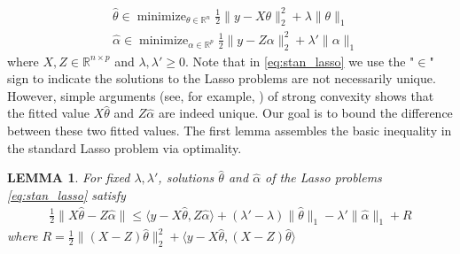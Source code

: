 \documentclass[a4paper]{article}
\newtheorem{lemma}{LEMMA}
\newcommand{\RR}{\mathbb{R}}
\DeclareMathOperator*{\minimize}{minimize}
\begin{document}
\begin{equation}
\begin{aligned}
&\hat{\theta} \in \minimize_{\theta\in\RR^n} \frac{1}{2}\|y-X\theta\|_2^2 + \lambda\|\theta\|_1\\
&\hat{\alpha} \in \minimize_{\alpha\in\RR^p} \frac{1}{2}\|y-Z\alpha\|_2^2 + \lambda'\|\alpha\|_1
\end{aligned}
\label{eq:stan_lasso}
\end{equation}
where $X,Z\in\RR^{n\times p}$ and $\lambda,\lambda'\geq 0$. Note that in \eqref{eq:stan_lasso} we use the "$\in$" sign to indicate the solutions to the  Lasso problems are not necessarily unique. However, simple arguments (see, for example, \cite{tibshirani2013lasso}) of strong convexity shows that the fitted value $X\hat{\theta}$ and $Z\hat{\alpha}$ are indeed unique. Our goal is to bound the difference between these two fitted values. The first lemma assembles the basic inequality in the standard Lasso problem via optimality.

\begin{lemma}
For fixed $\lambda, \lambda'$, solutions $\hat{\theta}$ and $\hat{\alpha}$ of the Lasso problems \eqref{eq:stan_lasso} satisfy
\begin{align*}
\frac{1}{2}\|X\hat{\theta} - Z\hat{\alpha}\| \leq \langle y-X\hat{\theta}, Z\hat{\alpha}\rangle + (\lambda'-\lambda)\|\hat{\theta}\|_1 - \lambda'\|\hat{\alpha}\|_1 + R
\end{align*}
where $R = \frac{1}{2}\|(X-Z)\hat{\theta}\|_2^2 + \langle y-X\hat{\theta}, (X-Z)\hat{\theta}\rangle$
\label{lemma:lemma_1}
\end{lemma}
\end{document}
